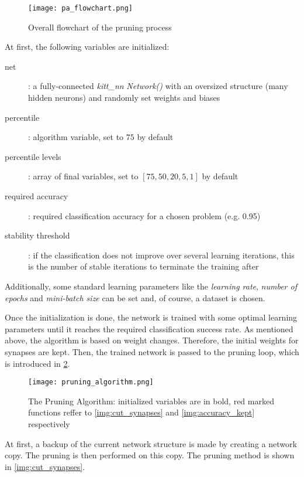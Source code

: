 \begin{figure}[H]
  \centering
  \texttt{[image: pa\_flowchart.png]}
  \caption{Overall flowchart of the pruning process}
  \label{img:pa_flowchart}
\end{figure}

At first, the following variables are initialized:

\begin{description}
\item[net] : a fully-connected \textit{kitt\_nn} \textit{Network()} with an oversized structure (many hidden neurons) and randomly set weights and biases
\item[percentile] : algorithm variable, set to $ 75 $ by default
\item[percentile levels] : array of final variables, set to $ [75, 50, 20, 5, 1] $ by default
\item[required accuracy] : required classification accuracy for a chosen problem (e.g. 0.95)
\item[stability threshold] : if the classification does not improve over several learning iterations, this is the number of stable iterations to terminate the training after
\end{description}

Additionally, some standard learning parameters like the \textit{learning rate}, \textit{number of epochs} and \textit{mini-batch size} can be set and, of course, a dataset is chosen.

Once the initialization is done, the network is trained with some optimal learning parameters until it reaches the required classification success rate. As mentioned above, the algorithm is based on weight changes. Therefore, the initial weights for synapses are kept. Then, the trained network is passed to the pruning loop, which is introduced in \cref{img:pruning_algorithm}.

\begin{figure}[H]
  \centering
  \texttt{[image: pruning\_algorithm.png]}
  \caption{The Pruning Algorithm: initialized variables are in bold, red marked functions reffer to \ref{img:cut_synapses} and \ref{img:accuracy_kept} respectively}
  \label{img:pruning_algorithm}
\end{figure}

At first, a backup of the current network structure is made by creating a network copy. The pruning is then performed on this copy. The pruning method is shown in \cref{img:cut_synapses}.

